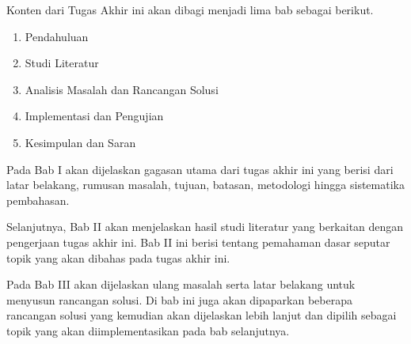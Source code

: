 Konten dari Tugas Akhir ini akan dibagi menjadi lima bab sebagai berikut.
\begin{enumerate}
    \item Pendahuluan
    \item Studi Literatur
    \item Analisis Masalah dan Rancangan Solusi
    \item Implementasi dan Pengujian
    \item Kesimpulan dan Saran
\end{enumerate}

Pada Bab I akan dijelaskan gagasan utama dari tugas akhir ini yang berisi dari latar belakang, rumusan masalah, tujuan, batasan, metodologi hingga sistematika pembahasan.

Selanjutnya, Bab II akan menjelaskan hasil studi literatur yang berkaitan dengan pengerjaan tugas akhir ini. Bab II ini berisi tentang pemahaman dasar seputar topik yang akan dibahas pada tugas akhir ini.

Pada Bab III akan dijelaskan ulang masalah serta latar belakang untuk menyusun rancangan solusi. Di bab ini juga akan dipaparkan beberapa rancangan solusi yang kemudian akan dijelaskan lebih lanjut dan dipilih sebagai topik yang akan diimplementasikan pada bab selanjutnya.


